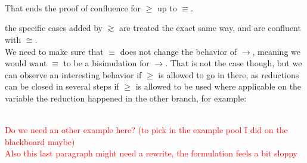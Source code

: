 \begin{myproof}
\\
\\~\\
That ends the proof of confluence for $\geq$ up to $\equiv$.
\end{myproof}

\remark the specific cases added by $\gtrsim$ are treated the exact same way, and are confluent with $\cong$.\\

We need to make sure that $\equiv$ does not change the behavior of $\to$, meaning we would want $\equiv$ to be a bisimulation for $\to$. That is not the case though, but we can observe an interesting behavior if $\geq$ is allowed to go in there, as reductions can be closed in several steps if $\geq$ is allowed to be used where applicable on the variable the reduction happened in the other branch, for example:

\\

\textcolor{red}{Do we need an other example here? (to pick in the example pool I did on the blackboard maybe)\\
Also this last paragraph might need a rewrite, the formulation feels a bit sloppy}